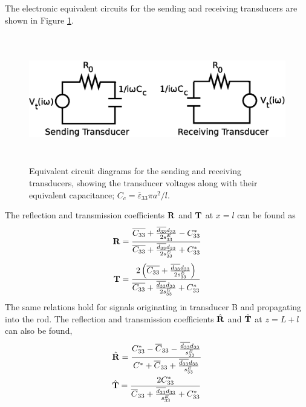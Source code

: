 \documentclass[11pt,letterpaper]{article}%
\begin{document}
The electronic equivalent circuits for the sending and receiving
transducers are shown in Figure \ref{equiv_circ}.
\begin{figure}
\begin{center}
\includegraphics[width=12.70cm,height=5.60cm]{trans_circ.eps}
\end{center}
 \caption[des1]
   { \label{equiv_circ}
Equivalent circuit diagrams for the sending and receiving
transducers, showing the transducer voltages along with their
equivalent capacitance; $C_c = \overline{\varepsilon}_{33}\pi
a^2/l$.}
\end{figure}
The reflection and transmission coefficients ${\bf R}$ and ${\bf
T}$ at $x = l$ can be found as
\begin{equation}
{\bf R} = \frac{\overline{C_{33}}+
\frac{\overline{d_{33}}d_{33}}{2s^E_{33}} -
C^\ast_{33}}{\overline{C_{33}}+
\frac{\overline{d_{33}}d_{33}}{2s^E_{33}} + C^\ast_{33}}
\label{refcof1}
\end{equation}
\begin{equation}
{\bf T} = \frac{2\left(\overline{C_{33}}+
\frac{\overline{d_{33}}d_{33}}{2s^E_{33}}\right)}{\overline{C_{33}}+
\frac{\overline{d_{33}}d_{33}}{2s^E_{33}} + C^\ast_{33}}
\label{transcof1}
\end{equation}
The same relations hold for signals originating in transducer B
and propagating into the rod.  The reflection and transmission
coefficients $\hat{\bf R}$ and $\hat{\bf T}$ at $z=L+l$ can also
be found,
%
\begin{align}
&\hat{\bf R} = \frac{C^\ast_{33} - \overline{C}_{33} -
\frac{\overline{d_{33}}d_{33}}{s^E_{33}}}{C^\ast +
\overline{C}_{33} +
\frac{\overline{d_{33}}d_{33}}{s^E_{33}}} \nonumber\\
&\hat{\bf T} = \frac{2C^\ast_{33}}{\overline{C}_{33} +
\frac{\overline{d_{33}}d_{33}}{s^E_{33}}+ C^{\ast}_{33}}
\label{rbar2}
\end{align}
\end{document}

